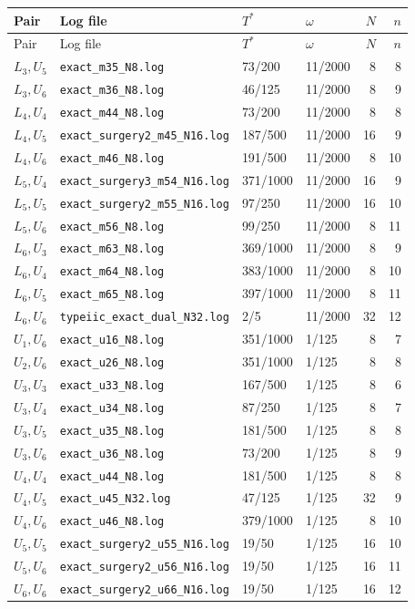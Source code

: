 \documentclass[11pt]{article}
\theoremstyle{definition}
\theoremstyle{remark}
\begin{document}
\begin{longtable}{llllrr}
\toprule
Pair&Log file&\(T^*\)&\(\omega\)&\(N\)&\(n\)\\
\midrule
\endfirsthead
\toprule
Pair&Log file&\(T^*\)&\(\omega\)&\(N\)&\(n\)\\
\midrule
\endhead
\(L_3,U_5\)&\texttt{exact\_m35\_N8.log}&73/200&11/2000&8&8\\
\(L_3,U_6\)&\texttt{exact\_m36\_N8.log}&46/125&11/2000&8&9\\
\(L_4,U_4\)&\texttt{exact\_m44\_N8.log}&73/200&11/2000&8&8\\
\(L_4,U_5\)&\texttt{exact\_surgery2\_m45\_N16.log}&187/500&11/2000&16&9\\
\(L_4,U_6\)&\texttt{exact\_m46\_N8.log}&191/500&11/2000&8&10\\
\(L_5,U_4\)&\texttt{exact\_surgery3\_m54\_N16.log}&371/1000&11/2000&16&9\\
\(L_5,U_5\)&\texttt{exact\_surgery2\_m55\_N16.log}&97/250&11/2000&16&10\\
\(L_5,U_6\)&\texttt{exact\_m56\_N8.log}&99/250&11/2000&8&11\\
\(L_6,U_3\)&\texttt{exact\_m63\_N8.log}&369/1000&11/2000&8&9\\
\(L_6,U_4\)&\texttt{exact\_m64\_N8.log}&383/1000&11/2000&8&10\\
\(L_6,U_5\)&\texttt{exact\_m65\_N8.log}&397/1000&11/2000&8&11\\
\(L_6,U_6\)&\texttt{typeiic\_exact\_dual\_N32.log}&2/5&11/2000&32&12\\
\addlinespace
\(U_1,U_6\)&\texttt{exact\_u16\_N8.log}&351/1000&1/125&8&7\\
\(U_2,U_6\)&\texttt{exact\_u26\_N8.log}&351/1000&1/125&8&8\\
\(U_3,U_3\)&\texttt{exact\_u33\_N8.log}&167/500&1/125&8&6\\
\(U_3,U_4\)&\texttt{exact\_u34\_N8.log}&87/250&1/125&8&7\\
\(U_3,U_5\)&\texttt{exact\_u35\_N8.log}&181/500&1/125&8&8\\
\(U_3,U_6\)&\texttt{exact\_u36\_N8.log}&73/200&1/125&8&9\\
\(U_4,U_4\)&\texttt{exact\_u44\_N8.log}&181/500&1/125&8&8\\
\(U_4,U_5\)&\texttt{exact\_u45\_N32.log}&47/125&1/125&32&9\\
\(U_4,U_6\)&\texttt{exact\_u46\_N8.log}&379/1000&1/125&8&10\\
\(U_5,U_5\)&\texttt{exact\_surgery2\_u55\_N16.log}&19/50&1/125&16&10\\
\(U_5,U_6\)&\texttt{exact\_surgery2\_u56\_N16.log}&19/50&1/125&16&11\\
\(U_6,U_6\)&\texttt{exact\_surgery2\_u66\_N16.log}&19/50&1/125&16&12\\
\bottomrule
\end{longtable}
\end{document}
